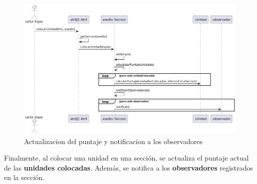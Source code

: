 \documentclass[titlepage,a4paper]{article}
\begin{document}
	\begin{figure}[H]
		\centering
		\includegraphics[width=1\textwidth]{diagramas/secuencia/jugarCarta4}
		\caption{\label{fig:secuencia04} Actualizacion del puntaje y notificacion a los observadores}
	\end{figure}
	Finalmente, al colocar una unidad en una sección, se actualiza el puntaje actual de las \textbf{unidades colocadas}. Además, se notifica a los \textbf{observadores} registrados en la sección.
\end{document}
